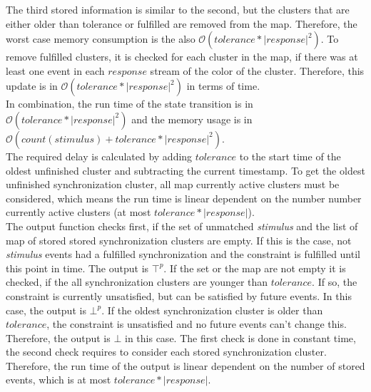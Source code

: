 	The third stored information is similar to the second, but the clusters that are either older than tolerance or fulfilled are removed from the map. Therefore, the worst case memory consumption is the also $\mathcal{O}(tolerance*|response|^2)$. To remove fulfilled clusters, it is checked for each cluster in the map, if there was at least one event in each $response$ stream of the color of the cluster. Therefore, this update is in $\mathcal{O}(tolerance*|response|^2)$ in terms of time.\\
	In combination, the run time of the state transition is in $\mathcal{O}(tolerance*|response|^2)$ and the memory usage is in $\mathcal O(count(stimulus) + tolerance*|response|^2)$.\\
	The required delay is calculated by adding $tolerance$ to the start time of the oldest unfinished cluster and subtracting the current timestamp. To get the oldest unfinished synchronization cluster, all map currently active clusters must be considered, which means the run time is linear dependent on the number number currently active clusters (at most $tolerance*|response|$).\\
	The output function checks first, if the set of unmatched \textit{stimulus} and the list of map of stored stored synchronization clusters are empty. If this is the case, not \textit{stimulus} events had a fulfilled synchronization and the constraint is fulfilled until this point in time. The output is $\top^p$. If the set or the map are not empty it is checked, if the all synchronization clusters are younger than $tolerance$. If so, the constraint is currently unsatisfied, but can be satisfied by future events. In this case, the output is $\bot^p$. If the oldest synchronization cluster is older than $tolerance$, the constraint is unsatisfied and no future events can't change this. Therefore, the output is $\bot$ in this case. The first check is done in constant time, the second check requires to consider each stored synchronization cluster. Therefore, the run time of the output is linear dependent on the number of stored events, which is at most $tolerance*|response|$.
	
